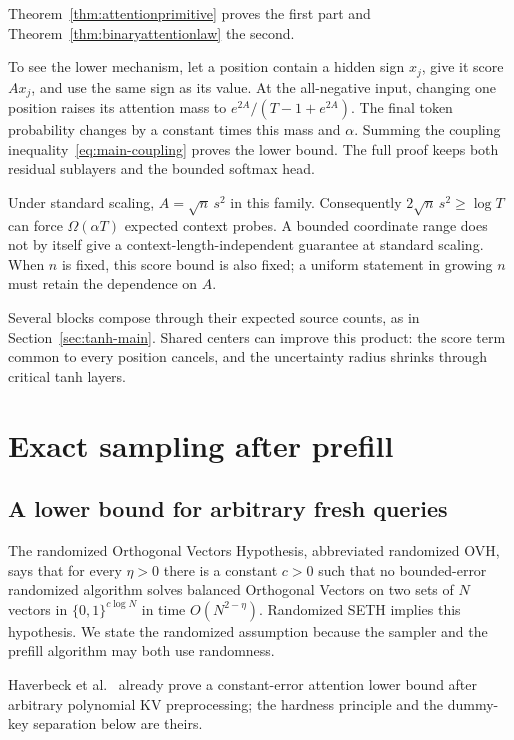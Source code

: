 Theorem~\ref{thm:attentionprimitive} proves the first part and
Theorem~\ref{thm:binaryattentionlaw} the second.

To see the lower mechanism, let a position contain a hidden sign
$x_j$, give it score $Ax_j$, and use the same sign as its value.
At the all-negative input, changing one position raises its
attention mass to $e^{2A}/(T-1+e^{2A})$. The final token probability
changes by a constant times this mass and $\alpha$. Summing the
coupling inequality~\eqref{eq:main-coupling} proves the lower bound.
The full proof keeps both residual sublayers and the bounded
softmax head.

Under standard scaling, $A=\sqrt n\,s^2$ in this family.
Consequently $2\sqrt n\,s^2\ge\log T$ can force
$\Omega(\alpha T)$ expected context probes. A bounded coordinate
range does not by itself give a context-length-independent
guarantee at standard scaling. When $n$ is fixed, this score bound
is also fixed; a uniform statement in growing $n$ must retain
the dependence on $A$.

Several blocks compose through their expected source counts, as in
Section~\ref{sec:tanh-main}. Shared centers can improve this product:
the score term common to every position cancels, and the uncertainty
radius shrinks through critical tanh layers.

\section{Exact sampling after prefill}
\label{sec:index-main}

\subsection{A lower bound for arbitrary fresh queries}

The randomized Orthogonal Vectors Hypothesis, abbreviated randomized
OVH, says that for every $\eta>0$ there is a constant $c>0$ such
that no bounded-error randomized algorithm solves balanced
Orthogonal Vectors on two sets of $N$ vectors in
$\{0,1\}^{c\log N}$ in time $O(N^{2-\eta})$.
Randomized SETH implies this hypothesis. We state the randomized
assumption because the sampler and the prefill algorithm may
both use randomness.

Haverbeck et al.~\cite[Theorem 4.1]{haverbeck2026attention} already
prove a constant-error attention lower bound after arbitrary
polynomial KV preprocessing; the hardness principle and the
dummy-key separation below are theirs.

